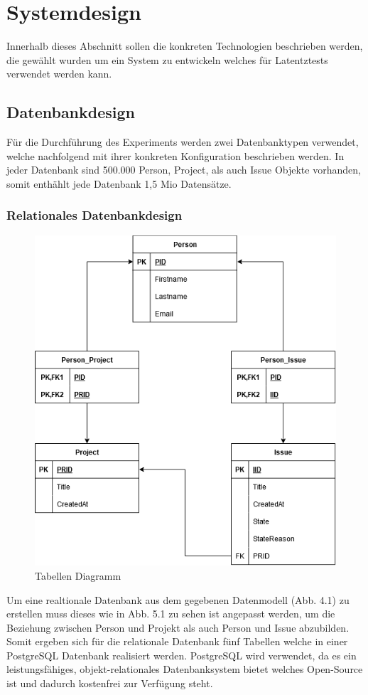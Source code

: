 \chapter{Systemdesign} %
\label{sec:systemdesign}
Innerhalb dieses Abschnitt sollen die konkreten Technologien beschrieben werden, die gewählt wurden um ein System zu entwickeln welches für Latentztests verwendet werden kann.
\section{Datenbankdesign} %
Für die Durchführung des Experiments werden zwei Datenbanktypen verwendet, welche nachfolgend mit ihrer konkreten Konfiguration beschrieben werden. In jeder Datenbank sind 500.000 Person, Project, als auch Issue Objekte vorhanden, somit enthählt jede Datenbank 1,5 Mio Datensätze.
\label{sec:datenbankdesign}
\subsection{Relationales Datenbankdesign} %
\label{sec:relationalesdatenbankdesign}

\begin{figure}[H]
	\centering
	\includegraphics[scale=0.6]{Illustrations/table_diagram.png}
	\caption{Tabellen Diagramm}
\end{figure}
Um eine realtionale Datenbank aus dem gegebenen Datenmodell (Abb. 4.1) zu erstellen muss dieses wie in Abb. 5.1 zu sehen ist angepasst werden, um die Beziehung zwischen Person und Projekt als auch Person und Issue abzubilden. Somit ergeben sich für die relationale Datenbank fünf Tabellen welche in einer PostgreSQL Datenbank realisiert werden. PostgreSQL wird verwendet, da es ein leistungsfähiges, objekt-relationales Datenbanksystem bietet welches Open-Source ist und dadurch kostenfrei zur Verfügung steht. 

